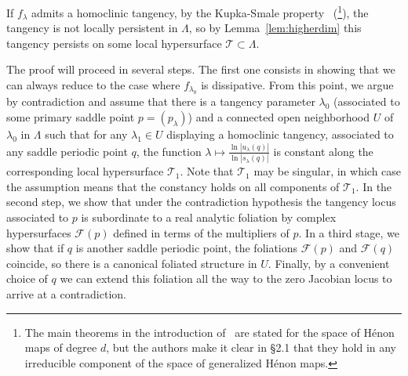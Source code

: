 \documentclass[11pt, oneside]{amsart}
\newcommand{\abs}[1]{\left\vert#1\right\vert}
\newcommand{\la}{\lambda}
\newcommand{\lo}{{\lambda_0}}
\theoremstyle{remark}
\theoremstyle{definition}
\theoremstyle{theorem}
\newcommand{\commentaire}[1]{}
\begin{document}
If $f_\lambda$ admits a homoclinic tangency, by  the Kupka-Smale property~\cite{BHI} (\footnote{The main theorems in the introduction of~\cite{BHI} are stated for the space of Hénon maps of degree $d$, but the authors make it clear in \S2.1 that they hold in any irreducible component of the space of generalized Hénon maps.}), 
the tangency is not locally persistent in $\Lambda$, so by Lemma~\ref{lem:higherdim}
this 
tangency persists on some local hypersurface $\mathcal T\subset \Lambda$. 

\commentaire{Paragraph added for Exposition remark \#4.} The proof will proceed in several steps. 
The first one consists in showing that we can always 
reduce to the case where $f_{\lo}$ is dissipative. 
From this point, we argue by contradiction and assume that there is a tangency parameter $\lo$ 
(associated to some primary saddle point $p = (p_\lambda)$) 
and a connected open neighborhood  $U$ of $\lo$ in $\Lambda$ 
such that 
for any $\la_1\in U$ displaying a homoclinic tangency, associated to any saddle periodic point $q$, the function $\lambda \mapsto \frac{\ln\abs{u_\la(q )}}{\ln\abs{s_\la(q )}}$ is 
constant along the corresponding local hypersurface $\mathcal T_1$. 
Note that $\mathcal T_1$ may be singular, in which case 
 the assumption means  that the constancy holds on all components of $\mathcal T_1$. 
In the second step, we show that under the contradiction hypothesis 
 the tangency locus associated to $p$ is subordinate to a real analytic foliation 
 by complex hypersurfaces
  $\mathcal F(p)$ defined in terms of the multipliers of $p$. In a third stage, we show
 that if $q$ is another saddle periodic point, the foliations $\mathcal F(p)$ and $\mathcal F(q)$ coincide, 
 so there is a canonical foliated structure in $U$. Finally, by a convenient choice of $q$ we can extend this foliation  all the way to the zero Jacobian locus to arrive at a contradiction. 
 
 
\end{document}
